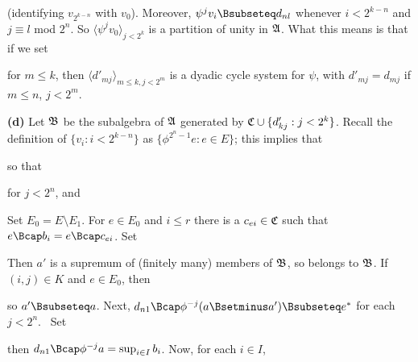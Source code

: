 {
     
\noindent (identifying $v_{2^{k-n}}$ with $v_0$).   Moreover,
$\psi^jv_i\Bsubseteq d_{nl}$ whenever $i<2^{k-n}$ and
$j\equiv l$ mod $2^n$.   So
$\langle\psi^jv_0\rangle_{j<2^k}$ is a partition of unity in $\frak A$.
What this means is that if we set
     
     
\noindent for $m\le k$, then $\langle d'_{mj}\rangle_{m\le k,j<2^m}$ is
a dyadic cycle system for $\psi$, with $d'_{mj}=d_{mj}$ if $m\le n$,
$j<2^m$.
     
\medskip
     
{\bf (d)} Let $\frak B$ be the subalgebra of $\frak A$ generated by
$\frak C\cup\{d'_{kj}:j<2^k\}$.
Recall the definition of $\{v_i:i<2^{k-n}\}$ as
$\{\phi^{2^n-1}e:e\in E\}$;  this implies that
     
     
\noindent so that
     
     
\noindent for $j<2^n$, and
     
     
Set $E_0=E\setminus E_1$.   For $e\in E_0$ and $i\le r$ there is a
$c_{ei}\in\frak C$ such that $e\Bcap b_i=e\Bcap c_{ei}$.   Set
     
     
     
\noindent Then $a'$ is a supremum of (finitely many)
members of $\frak B$, so belongs to $\frak B$.   If $(i,j)\in K$ and
$e\in E_0$, then
     
     
\noindent so $a'\Bsubseteq a$.   Next,
$d_{n1}\Bcap\phi^{-j}(a\Bsetminus a')\Bsubseteq e^*$ for each $j<2^n$.
\Prf\ Set
     
     
\noindent then $d_{n1}\Bcap\phi^{-j}a=\sup_{i\in I}b_i$.
Now, for each $i\in I$,
     
}
